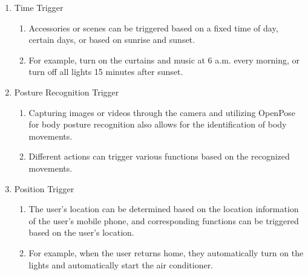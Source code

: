 \begin{enumerate}[label=\arabic*.]
\begin{enumerate}[label*={\arabic*.}]
\begin{enumerate}[label*={\alph*.},ref=\theenumi.\arabic*]
                \item {\large{Time Trigger}}\\
                \begin{enumerate}[label*={\arabic*.},ref=\theenumi.\arabic*]
                \setlength{\itemindent}{0.5cm}
                    \item Accessories or scenes can be triggered based on a fixed time of day, certain days, or based on sunrise and sunset. \\
                    \item For example, turn on the curtains and music at 6 a.m. every morning, or turn off all lights 15 minutes after sunset.\\
                \end{enumerate}
                
                \item {\large{Posture Recognition Trigger}}\\
                \begin{enumerate}[label*={\arabic*.},ref=\theenumi.\arabic*]
                \setlength{\itemindent}{0.5cm}
                    \item Capturing images or videos through the camera and utilizing OpenPose for body posture recognition also allows for the identification of body movements.\\
                    \item Different actions can trigger various functions based on the recognized movements.\\
                \end{enumerate}

                \item {\large{Position Trigger}}\\
                \begin{enumerate}[label*={\arabic*.},ref=\theenumi.\arabic*]
                \setlength{\itemindent}{0.5cm}
                    \item The user's location can be determined based on the location information of the user's mobile phone, and corresponding functions can be triggered based on the user's location.\\ 
                    \item For example, when the user returns home, they automatically turn on the lights and automatically start the air conditioner.\\
            \end{enumerate}
    

\end{enumerate}
\end{enumerate}
\end{enumerate}
